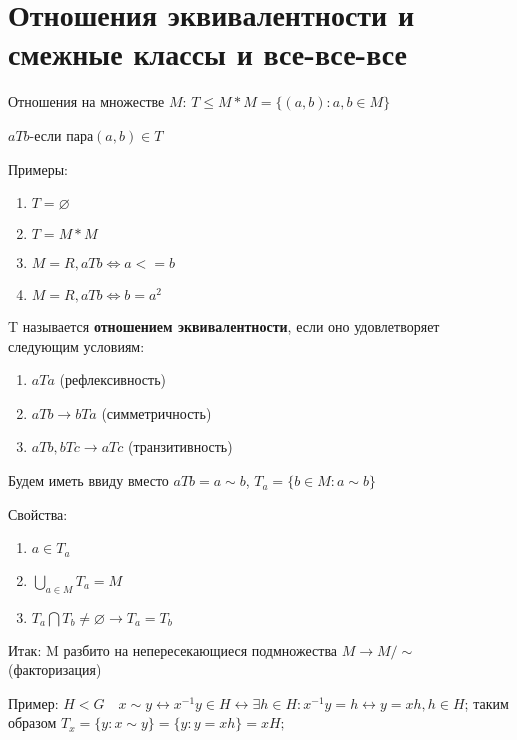 \documentclass[12pt]{article}
\begin{document}
		
		
		
		\newpage
		\section{Отношения эквивалентности и смежные классы и все-все-все}
		
		Отношения на множестве $M$:
		$T \le M*M=\{(a,b):a,b\in M\}$
		
		$aTb$-если пара$(a,b)\in T$ 
		
		Примеры:
		\begin{enumerate}
			\item $T=\varnothing$
			\item $T=M*M$
			\item $M=R, aTb \Leftrightarrow a<=b$
			\item $M=R, aTb \Leftrightarrow b=a^2$
		\end{enumerate}
		
		T называется \hypertarget{indef:equiv}{\textbf{отношением эквивалентности}}, если оно удовлетворяет следующим условиям:
		\begin{enumerate}
			\item $aTa$ (рефлексивность)
			\item $aTb \rightarrow bTa$ (симметричность)
			\item $aTb, bTc \rightarrow aTc$ (транзитивность)
		\end{enumerate}
		
		Будем иметь ввиду вместо $aTb=a\sim b$, $T_a=\{b\in M:a\sim b\}$
		
		Свойства:
		\begin{enumerate}
			\item $a\in T_a$
			\item $\bigcup_{a\in M} T_a=M$
			\item $T_a \bigcap T_b \not= \varnothing \rightarrow T_a=T_b$
		\end{enumerate}
		
		
		Итак: M разбито на непересекающиеся подмножества $M\rightarrow M/\sim$ (факторизация)
		
		Пример: $H<G \quad x\sim y \leftrightarrow x^{-1}y \in H \leftrightarrow \exists h\in H: x^{-1}y=h\leftrightarrow y=xh, h\in H$; таким образом $T_x=\{y:x\sim y\}=\{y:y=xh\}=xH;$
		
\end{document}
